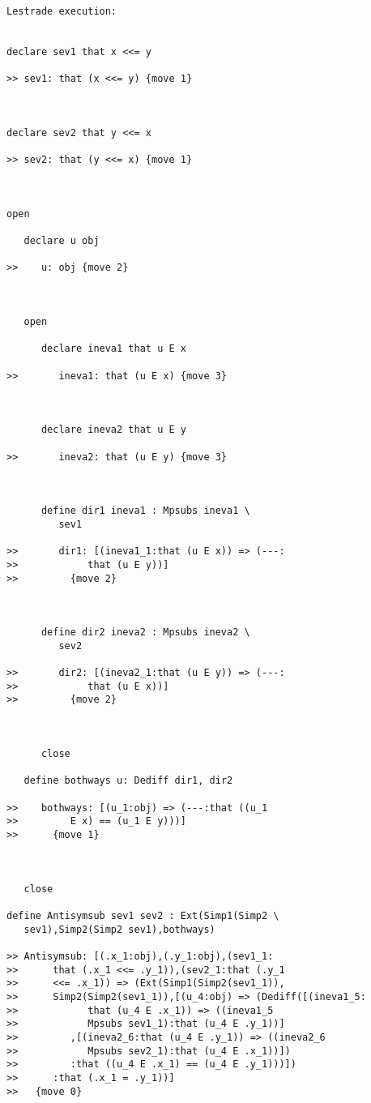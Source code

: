 \documentclass[12pt]{article}
\begin{document}
\begin{verbatim}Lestrade execution:


declare sev1 that x <<= y

>> sev1: that (x <<= y) {move 1}



declare sev2 that y <<= x

>> sev2: that (y <<= x) {move 1}



open

   declare u obj

>>    u: obj {move 2}



   open

      declare ineva1 that u E x

>>       ineva1: that (u E x) {move 3}



      declare ineva2 that u E y

>>       ineva2: that (u E y) {move 3}



      define dir1 ineva1 : Mpsubs ineva1 \
         sev1

>>       dir1: [(ineva1_1:that (u E x)) => (---:
>>            that (u E y))]
>>         {move 2}



      define dir2 ineva2 : Mpsubs ineva2 \
         sev2

>>       dir2: [(ineva2_1:that (u E y)) => (---:
>>            that (u E x))]
>>         {move 2}



      close

   define bothways u: Dediff dir1, dir2

>>    bothways: [(u_1:obj) => (---:that ((u_1
>>         E x) == (u_1 E y)))]
>>      {move 1}



   close

define Antisymsub sev1 sev2 : Ext(Simp1(Simp2 \
   sev1),Simp2(Simp2 sev1),bothways)

>> Antisymsub: [(.x_1:obj),(.y_1:obj),(sev1_1:
>>      that (.x_1 <<= .y_1)),(sev2_1:that (.y_1
>>      <<= .x_1)) => (Ext(Simp1(Simp2(sev1_1)),
>>      Simp2(Simp2(sev1_1)),[(u_4:obj) => (Dediff([(ineva1_5:
>>            that (u_4 E .x_1)) => ((ineva1_5
>>            Mpsubs sev1_1):that (u_4 E .y_1))]
>>         ,[(ineva2_6:that (u_4 E .y_1)) => ((ineva2_6
>>            Mpsubs sev2_1):that (u_4 E .x_1))])
>>         :that ((u_4 E .x_1) == (u_4 E .y_1)))])
>>      :that (.x_1 = .y_1))]
>>   {move 0}


\end{verbatim}
\end{document}
